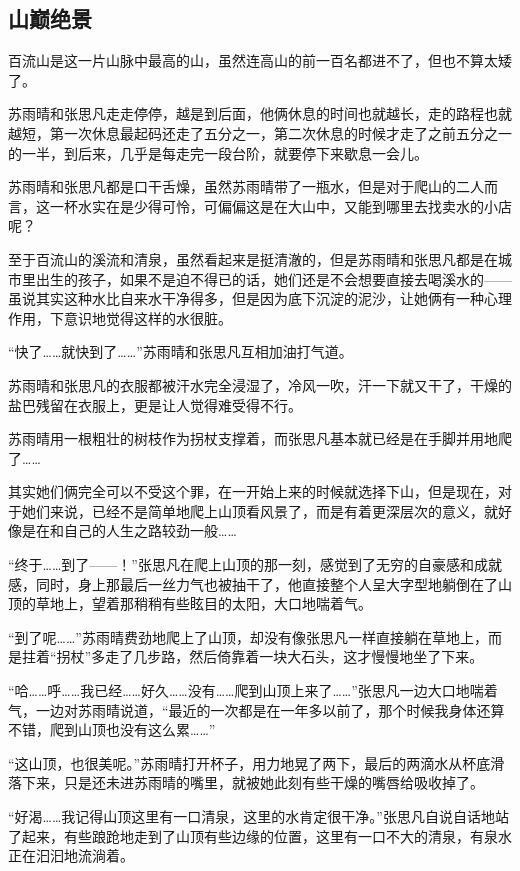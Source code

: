 \subsection{山巅绝景}

百流山是这一片山脉中最高的山，虽然连高山的前一百名都进不了，但也不算太矮了。

苏雨晴和张思凡走走停停，越是到后面，他俩休息的时间也就越长，走的路程也就越短，第一次休息最起码还走了五分之一，第二次休息的时候才走了之前五分之一的一半，到后来，几乎是每走完一段台阶，就要停下来歇息一会儿。

苏雨晴和张思凡都是口干舌燥，虽然苏雨晴带了一瓶水，但是对于爬山的二人而言，这一杯水实在是少得可怜，可偏偏这是在大山中，又能到哪里去找卖水的小店呢？

至于百流山的溪流和清泉，虽然看起来是挺清澈的，但是苏雨晴和张思凡都是在城市里出生的孩子，如果不是迫不得已的话，她们还是不会想要直接去喝溪水的——虽说其实这种水比自来水干净得多，但是因为底下沉淀的泥沙，让她俩有一种心理作用，下意识地觉得这样的水很脏。

“快了……就快到了……”苏雨晴和张思凡互相加油打气道。

苏雨晴和张思凡的衣服都被汗水完全浸湿了，冷风一吹，汗一下就又干了，干燥的盐巴残留在衣服上，更是让人觉得难受得不行。

苏雨晴用一根粗壮的树枝作为拐杖支撑着，而张思凡基本就已经是在手脚并用地爬了……

其实她们俩完全可以不受这个罪，在一开始上来的时候就选择下山，但是现在，对于她们来说，已经不是简单地爬上山顶看风景了，而是有着更深层次的意义，就好像是在和自己的人生之路较劲一般……

“终于……到了——！”张思凡在爬上山顶的那一刻，感觉到了无穷的自豪感和成就感，同时，身上那最后一丝力气也被抽干了，他直接整个人呈大字型地躺倒在了山顶的草地上，望着那稍稍有些眩目的太阳，大口地喘着气。

“到了呢……”苏雨晴费劲地爬上了山顶，却没有像张思凡一样直接躺在草地上，而是拄着“拐杖”多走了几步路，然后倚靠着一块大石头，这才慢慢地坐了下来。

“哈……呼……我已经……好久……没有……爬到山顶上来了……”张思凡一边大口地喘着气，一边对苏雨晴说道，“最近的一次都是在一年多以前了，那个时候我身体还算不错，爬到山顶也没有这么累……”

“这山顶，也很美呢。”苏雨晴打开杯子，用力地晃了两下，最后的两滴水从杯底滑落下来，只是还未进苏雨晴的嘴里，就被她此刻有些干燥的嘴唇给吸收掉了。

“好渴……我记得山顶这里有一口清泉，这里的水肯定很干净。”张思凡自说自话地站了起来，有些踉跄地走到了山顶有些边缘的位置，这里有一口不大的清泉，有泉水正在汩汩地流淌着。

